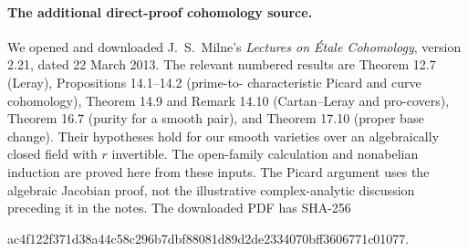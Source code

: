 \paragraph{The additional direct-proof cohomology source.}
We opened and downloaded J.~S.~Milne's \emph{Lectures on \'Etale
Cohomology}, version 2.21, dated 22 March 2013. The relevant numbered
results are Theorem 12.7 (Leray), Propositions 14.1--14.2 (prime-to-
characteristic Picard and curve cohomology), Theorem 14.9 and Remark
14.10 (Cartan--Leray and pro-covers), Theorem 16.7 (purity for a smooth
pair), and Theorem 17.10 (proper base change). Their hypotheses hold
for our smooth varieties over an algebraically closed field with
$r$ invertible. The open-family calculation and nonabelian induction
are proved here from these inputs. The Picard argument uses the
algebraic Jacobian proof, not the illustrative complex-analytic
discussion preceding it in the notes. The downloaded PDF has SHA-256
\begin{center}\footnotesize\ttfamily
ac4f122f371d38a44c58c296b7dbf88081d89d2de2334070bff3606771c01077.
\end{center}
